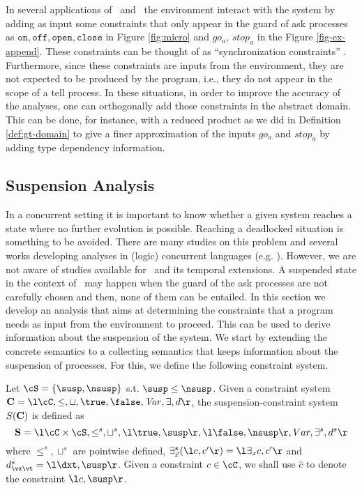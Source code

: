 \documentclass{tlp}
\begin{document}
\begin{observation}
 In several  applications of \tccp\ and \utcc\  the environment interact with the system by adding as input some constraints that only appear in the guard of ask processes as   $\texttt{on}, \texttt{off}, \texttt{open}, \texttt{close} $ in Figure \ref{fig:micro} and 
$go_a$, $stop_a$  in the Figure \ref{fig-ex-append}. These constraints can be thought of as ``synchronization constraints''  \cite{DBLP:journals/iandc/FagesRS01}. Furthermore, since these constraints are inputs from the environment, they are not expected to be produced by the program, i.e., they do not appear in the scope of a tell process. In these situations, in order to improve the accuracy of the analyses, one can orthogonally add  those constraints in the abstract domain. This can be done,  for instance,  with a reduced product as we did in Definition \ref{def:gt-domain} to  give a finer approximation of the inputs $go_a$ and $stop_a$ by adding type dependency information.
\end{observation}






\subsection{Suspension Analysis}
In a concurrent setting it is important to know whether  a given system 
reaches a state where no further evolution is possible. 
Reaching a deadlocked situation is something to be avoided. There are many studies on this problem and 
several works developing analyses in (logic) concurrent languages
(e.g. \cite{CFM94,CFMW97}). However, we are not aware of studies 
available for \ccp\ and its temporal extensions. A  suspended state in the context of 
\ccp\  may happen when the guard of the ask processes  are not carefully chosen and then, none of them can be entailed. In this section we develop an analysis  that 
aims at determining the  constraints that a program needs as input from 
the environment to proceed. This can be used to derive information about 
the suspension of the system. We start by   extending  the concrete semantics to a 
collecting semantics that keeps information about the suspension of processes. 
For this, we define  the following constraint system. 

 
\begin{definition}\label{def:sync-cs}
Let  $\cS  = \{\susp,\nsusp\}$ s.t. $\susp \leq \nsusp$. Given a constraint system ${\bf C}= \l \cC,\leq,\sqcup,\true,\false,{\it Var}, \exists, d\r$, the suspension-constraint system $S({\bf C})$ is defined as 
\[
{\bf S} = \l \cC \times \cS, \leq^s, \sqcup^s, \l \true, \susp \r,  
\l \false,\nsusp \r, Var, \exists^s, d^s
\r
\]
where $\leq^s, \sqcup^s$ are pointwise defined, $\exists^s_{\vec{x}}(\l c, c' \r) = \l \exists_x c, c' \r$ and $d^s_{\vx\vt} = \l \dxt , \susp \r$.
Given a constraint $c\in \cC$, we shall use 
 $\widehat{c}$ to denote the constraint  $\l c, \susp \r$. 
\end{definition}
\end{document}
